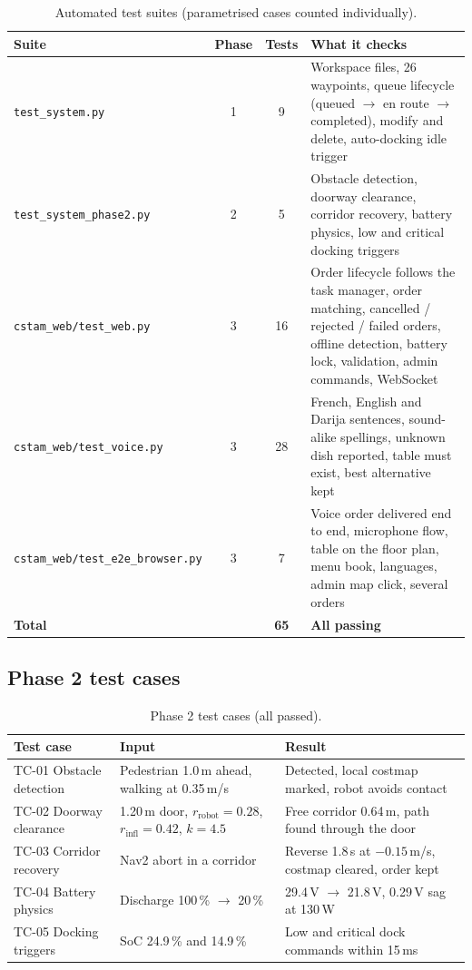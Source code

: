 \documentclass[11pt,a4paper]{article}
\begin{document}
\begin{table}[H]
\centering
\small
\begin{tabularx}{\linewidth}{l c c L}
\toprule
\textbf{Suite} & \textbf{Phase} & \textbf{Tests} & \textbf{What it checks} \\
\midrule
\texttt{test\_system.py} & 1 & 9 & Workspace files, 26 waypoints, queue lifecycle (queued $\rightarrow$ en route $\rightarrow$ completed), modify and delete, auto-docking idle trigger \\
\texttt{test\_system\_phase2.py} & 2 & 5 & Obstacle detection, doorway clearance, corridor recovery, battery physics, low and critical docking triggers \\
\texttt{cstam\_web/test\_web.py} & 3 & 16 & Order lifecycle follows the task manager, order matching, cancelled / rejected / failed orders, offline detection, battery lock, validation, admin commands, WebSocket \\
\texttt{cstam\_web/test\_voice.py} & 3 & 28 & French, English and Darija sentences, sound-alike spellings, unknown dish reported, table must exist, best alternative kept \\
\texttt{cstam\_web/test\_e2e\_browser.py} & 3 & 7 & Voice order delivered end to end, microphone flow, table on the floor plan, menu book, languages, admin map click, several orders \\
\midrule
\textbf{Total} & & \textbf{65} & \textbf{All passing} \\
\bottomrule
\end{tabularx}
\caption{Automated test suites (parametrised cases counted individually).}
\end{table}

\subsection{Phase 2 test cases}

\begin{table}[H]
\centering
\small
\begin{tabularx}{\linewidth}{l L L}
\toprule
\textbf{Test case} & \textbf{Input} & \textbf{Result} \\
\midrule
TC-01 Obstacle detection & Pedestrian 1.0\,m ahead, walking at 0.35\,m/s & Detected, local costmap marked, robot avoids contact \\
TC-02 Doorway clearance & 1.20\,m door, $r_\text{robot}=0.28$, $r_\text{infl}=0.42$, $k=4.5$ & Free corridor 0.64\,m, path found through the door \\
TC-03 Corridor recovery & Nav2 abort in a corridor & Reverse 1.8\,s at $-0.15$\,m/s, costmap cleared, order kept \\
TC-04 Battery physics & Discharge 100\,\% $\rightarrow$ 20\,\% & 29.4\,V $\rightarrow$ 21.8\,V, 0.29\,V sag at 130\,W \\
TC-05 Docking triggers & SoC 24.9\,\% and 14.9\,\% & Low and critical dock commands within 15\,ms \\
\bottomrule
\end{tabularx}
\caption{Phase 2 test cases (all passed).}
\end{table}
\end{document}
